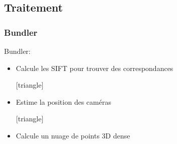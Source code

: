 	  
	  
	  
	  \subsection{Traitement}
	  
	  \begin{frame}
	  \frametitle{Bundler}
	   Bundler:
	  \begin{itemize}
	    [triangle]
	    \item Calcule les SIFT pour trouver des correspondances
	    
	    [triangle]
	    \item Estime la position des caméras
	    
	    [triangle]
	    \item Calcule un nuage de points 3D dense
	    \end{itemize}
	    

	  \end{frame}
	  	  
	  
